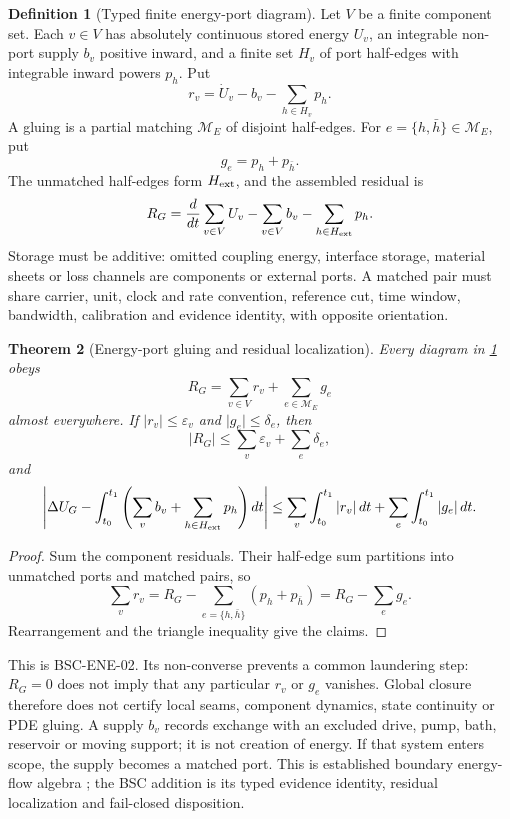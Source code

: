 \documentclass[11pt,a4paper]{article}
\theoremstyle{definition}
\newtheorem{definition}{Definition}[section]
\theoremstyle{plain}
\newtheorem{theorem}[definition]{Theorem}
\theoremstyle{remark}
\begin{document}
\begin{definition}[Typed finite energy-port diagram]
\label{def:energy-port}
Let \(V\) be a finite component set.  Each \(v\in V\) has absolutely
continuous stored energy \(U_v\), an integrable non-port supply \(b_v\)
positive inward, and a finite set \(H_v\) of port half-edges with integrable
inward powers \(p_h\).  Put
\[
r_v=\dot U_v-b_v-\sum_{h\in H_v}p_h.
\]
A gluing is a partial matching \(\mathcal M_E\) of disjoint half-edges.  For
\(e=\{h,\bar h\}\in\mathcal M_E\), put
\[
g_e=p_h+p_{\bar h}.
\]
The unmatched half-edges form \(H_{\rm ext}\), and the assembled residual is
\[
R_G
=
\frac d{dt}\sum_{v\in V}U_v
-\sum_{v\in V}b_v
-\sum_{h\in H_{\rm ext}}p_h .
\]
Storage must be additive: omitted coupling energy, interface storage,
material sheets or loss channels are components or external ports.  A
matched pair must share carrier, unit, clock and rate convention, reference
cut, time window, bandwidth, calibration and evidence identity, with
opposite orientation.
\end{definition}

\begin{theorem}[Energy-port gluing and residual localization]
\label{thm:energy-port}
Every diagram in \cref{def:energy-port} obeys
\begin{equation}\label{eq:energy-port}
\boxed{
R_G=\sum_{v\in V}r_v+\sum_{e\in\mathcal M_E}g_e
}
\end{equation}
almost everywhere.  If
\(\lvert r_v\rvert\le\varepsilon_v\) and
\(\lvert g_e\rvert\le\delta_e\), then
\[
\lvert R_G\rvert
\le\sum_v\varepsilon_v+\sum_e\delta_e,
\]
and
\[
\left|
\Delta U_G-\int_{t_0}^{t_1}
\left(\sum_vb_v+\sum_{h\in H_{\rm ext}}p_h\right)dt
\right|
\le
\sum_v\int_{t_0}^{t_1}|r_v|\,dt
+
\sum_e\int_{t_0}^{t_1}|g_e|\,dt .
\]
\end{theorem}
\begin{proof}
Sum the component residuals.  Their half-edge sum partitions into unmatched
ports and matched pairs, so
\[
\sum_vr_v=R_G-\sum_{e=\{h,\bar h\}}(p_h+p_{\bar h})
=R_G-\sum_eg_e .
\]
Rearrangement and the triangle inequality give the claims.
\end{proof}

This is BSC-ENE-02.  Its non-converse prevents a common laundering step:
\(R_G=0\) does not imply that any particular \(r_v\) or \(g_e\) vanishes.
Global closure therefore does not certify local seams, component dynamics,
state continuity or PDE gluing.  A supply \(b_v\) records exchange with an
excluded drive, pump, bath, reservoir or moving support; it is not creation
of energy.  If that system enters scope, the supply becomes a matched port.
This is established boundary energy-flow algebra
\citep{vanderschaft2002}; the BSC addition is its typed evidence identity,
residual localization and fail-closed disposition.
\end{document}
